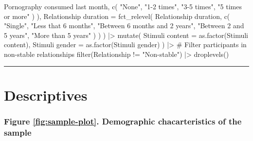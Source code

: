 \documentclass[
  bookmarksnumbered]{article}
\newenvironment{Shaded}{\begin{snugshade}}{\end{snugshade}}
\newcommand{\AttributeTok}[1]{\textcolor[rgb]{0.80,0.80,0.80}{#1}}
\newcommand{\CommentTok}[1]{\textcolor[rgb]{0.50,0.62,0.50}{#1}}
\newcommand{\FunctionTok}[1]{\textcolor[rgb]{0.94,0.94,0.56}{#1}}
\newcommand{\NormalTok}[1]{\textcolor[rgb]{0.80,0.80,0.80}{#1}}
\newcommand{\OtherTok}[1]{\textcolor[rgb]{0.94,0.94,0.56}{#1}}
\newcommand{\SpecialCharTok}[1]{\textcolor[rgb]{0.86,0.64,0.64}{#1}}
\newcommand{\StringTok}[1]{\textcolor[rgb]{0.80,0.58,0.58}{#1}}
\begin{document}
\begin{Shaded}
\begin{Highlighting}[]
      \StringTok{\textasciigrave{}}\AttributeTok{Pornography consumed last month}\StringTok{\textasciigrave{}}\NormalTok{,}
      \FunctionTok{c}\NormalTok{(}
        \StringTok{"None"}\NormalTok{, }\StringTok{"1{-}2 times"}\NormalTok{,}
        \StringTok{"3{-}5 times"}\NormalTok{, }\StringTok{"5 times or more"}
\NormalTok{      )}
\NormalTok{    ),}
    \StringTok{\textasciigrave{}}\AttributeTok{Relationship duration}\StringTok{\textasciigrave{}} \OtherTok{=} \FunctionTok{fct\_relevel}\NormalTok{(}
      \StringTok{\textasciigrave{}}\AttributeTok{Relationship duration}\StringTok{\textasciigrave{}}\NormalTok{,}
      \FunctionTok{c}\NormalTok{(}
        \StringTok{"Single"}\NormalTok{, }\StringTok{"Less that 6 months"}\NormalTok{,}
        \StringTok{"Between 6 months and 2 years"}\NormalTok{,}
        \StringTok{"Between 2 and 5 years"}\NormalTok{,}
        \StringTok{"More than 5 years"}
\NormalTok{      )}
\NormalTok{    )}
\NormalTok{  ) }\SpecialCharTok{|\textgreater{}}
  \FunctionTok{mutate}\NormalTok{(}
    \StringTok{\textasciigrave{}}\AttributeTok{Stimuli content}\StringTok{\textasciigrave{}} \OtherTok{=} \FunctionTok{as.factor}\NormalTok{(}\StringTok{\textasciigrave{}}\AttributeTok{Stimuli content}\StringTok{\textasciigrave{}}\NormalTok{),}
    \StringTok{\textasciigrave{}}\AttributeTok{Stimuli gender}\StringTok{\textasciigrave{}} \OtherTok{=} \FunctionTok{as.factor}\NormalTok{(}\StringTok{\textasciigrave{}}\AttributeTok{Stimuli gender}\StringTok{\textasciigrave{}}\NormalTok{)}
\NormalTok{  ) }\SpecialCharTok{|\textgreater{}}
  \CommentTok{\# Filter participants in non{-}stable relationships}
  \FunctionTok{filter}\NormalTok{(Relationship }\SpecialCharTok{!=} \StringTok{"Non{-}stable"}\NormalTok{) }\SpecialCharTok{|\textgreater{}}
  \FunctionTok{droplevels}\NormalTok{()}
\end{Highlighting}
\end{Shaded}

\begin{center}\rule{0.5\linewidth}{0.5pt}\end{center}

\section{Descriptives}\label{descriptives}

\subsubsection{Figure \ref{fig:sample-plot}. Demographic chacarteristics of the sample}\label{figure-reffigsample-plot.-demographic-chacarteristics-of-the-sample}
\end{document}
